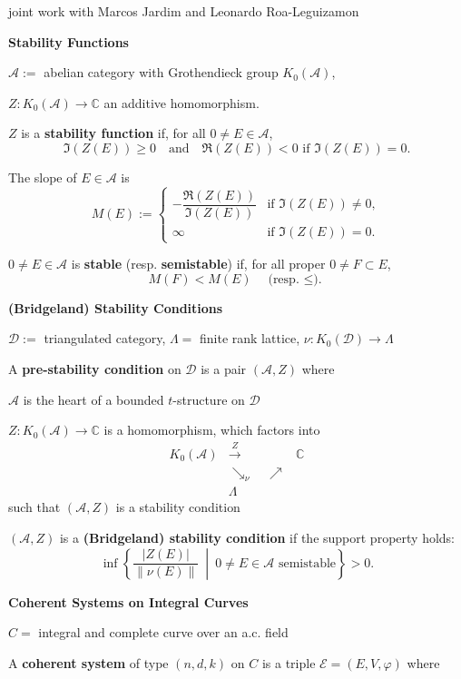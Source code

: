 joint work with Marcos Jardim and Leonardo
Roa-Leguizamon

\medskip\noindent
{\bf Stability Functions}

$\mathcal{A}:=$ abelian category with
Grothendieck group $K_0(\mathcal{A})$,

$Z:K_0(\mathcal{A})\to\mathbb{C}$ an
additive homomorphism.

$Z$ is a {\bf stability function} if, for
all $0\neq E\in\mathcal{A}$,
$$
\Im(Z(E))\geq 0
\quad\text{and}\quad
\Re(Z(E))<0
\text{ if }\Im(Z(E))=0.
$$

The slope of $E\in\mathcal{A}$ is
$$
M(E):=
\begin{cases}
-\dfrac{\Re(Z(E))}{\Im(Z(E))}
&\text{if }\Im(Z(E))\neq 0,\\[6pt]
\infty
&\text{if }\Im(Z(E))=0.
\end{cases}
$$

$0\neq E\in\mathcal{A}$ is {\bf stable}
(resp. {\bf semistable}) if, for all
proper $0\neq F\subset E$,
$$
M(F)<M(E)
\quad
\text{(resp. $\leq$).}
$$

\medskip\noindent
{\bf (Bridgeland) Stability Conditions}

$\mathcal{D}:=$ triangulated category,
$\Lambda=$ finite rank lattice,
$\nu:K_0(\mathcal{D})\to\Lambda$

A {\bf pre-stability condition} on
$\mathcal{D}$ is a pair
$(\mathcal{A},Z)$ where

$\mathcal{A}$ is the heart of a bounded
$t$-structure on $\mathcal{D}$

$Z:K_0(\mathcal{A})\to\mathbb{C}$ is a
homomorphism, which factors into
$$
\begin{array}{ccc}
K_0(\mathcal{A})
&\xrightarrow{\ Z\ }&
\mathbb{C}
\\
&\searrow_{\nu}\quad\nearrow&
\\[-6pt]
&\Lambda&
\end{array}
$$
such that $(\mathcal{A},Z)$ is a
stability condition

$(\mathcal{A},Z)$ is a
{\bf (Bridgeland) stability condition} if
the support property holds:
$$
\inf
\left\{
\frac{|Z(E)|}{\|\nu(E)\|}
\ \middle|\
0\neq E\in\mathcal{A}\text{ semistable}
\right\}
>0.
$$

\medskip\noindent
{\bf Coherent Systems on Integral Curves}

$C=$ integral and complete curve over an
a.c. field

A {\bf coherent system} of type $(n,d,k)$
on $C$ is a triple
$\mathcal{E}=(E,V,\varphi)$ where

